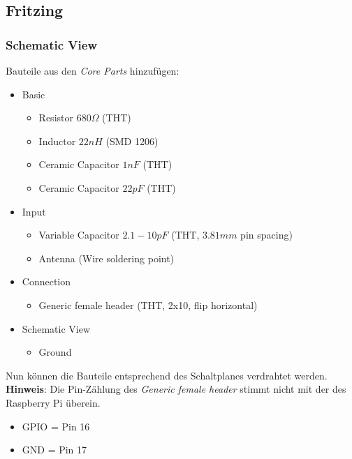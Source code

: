 \subsection*{Fritzing}

\subsubsection{Schematic View}

Bauteile aus den \emph{Core Parts} hinzufügen:

\begin{itemize}
    \item  Basic
    \begin{itemize}
        \item Resistor $680 \Omega$ (THT)
        \item Inductor $22 nH$ (SMD 1206)
        \item Ceramic Capacitor $1 nF$ (THT)
        \item Ceramic Capacitor $22 pF$ (THT)
    \end{itemize}
    \item  Input
    \begin{itemize}
        \item Variable Capacitor $2.1-10 pF$ (THT, $3.81mm$ pin spacing)
        \item Antenna (Wire soldering point)
    \end{itemize}
    \item Connection
    \begin{itemize}
        \item Generic female header (THT, 2x10, flip horizontal)
    \end{itemize}
    \item Schematic View
    \begin{itemize}
        \item Ground
    \end{itemize}
\end{itemize}

Nun können die Bauteile entsprechend des Schaltplanes verdrahtet werden.
\textbf{Hinweis}: Die Pin-Zählung des \emph{Generic female header} stimmt nicht
mit der des Raspberry Pi überein.

\begin{itemize}
    \item GPIO = Pin 16
    \item GND = Pin 17
\end{itemize}

